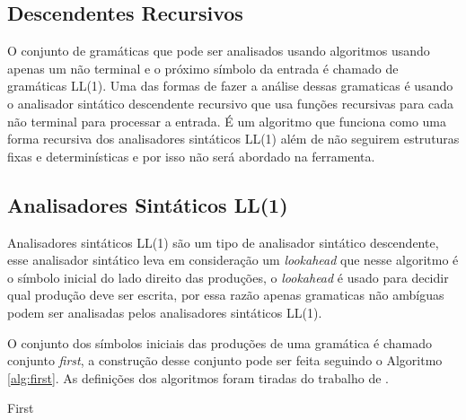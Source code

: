 \subsection{Descendentes Recursivos}
O conjunto de gramáticas que pode ser analisados usando algoritmos usando apenas um não terminal e o próximo símbolo da entrada é chamado de gramáticas LL(1). Uma das formas de fazer a análise dessas gramaticas é usando o analisador sintático descendente recursivo que usa funções recursivas para cada não terminal para processar a entrada. É um algoritmo que funciona como uma forma recursiva dos analisadores sintáticos LL(1) além de não seguirem estruturas fixas e determinísticas e por isso não será abordado na ferramenta.

\subsection{Analisadores Sintáticos LL(1)} 
Analisadores sintáticos LL(1) são um tipo de analisador sintático descendente, esse analisador sintático leva em consideração um \textit{lookahead} que nesse algoritmo é o símbolo inicial do lado direito das produções, o \textit{lookahead} é usado para decidir qual produção deve ser escrita, por essa razão apenas gramaticas não ambíguas podem ser analisadas pelos analisadores sintáticos LL(1).

O conjunto dos símbolos iniciais das produções de uma gramática é chamado conjunto \textit{first}, a construção desse conjunto pode ser feita seguindo o Algoritmo \ref{alg:first}. As definições dos algoritmos foram tiradas do trabalho de \textcite{thain2020introduction}.


\begin{algorithm}[htp]
    \caption{First}\label{alg:first}
\end{algorithm}


